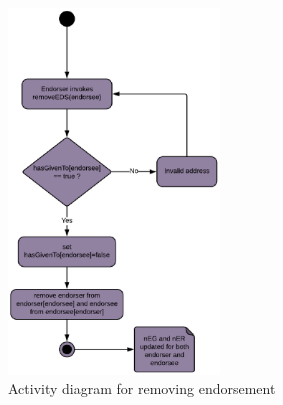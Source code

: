 \begin{figure}[h]
	\centering
	\includegraphics[width=0.5\textwidth]{Images/ActivityDiagramRemoveEDS.eps}
	\caption{Activity diagram for removing endorsement}
	\label{fig:removeEds}
\end{figure}

